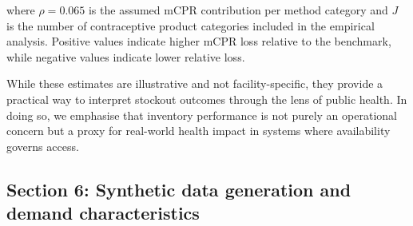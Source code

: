 \documentclass[
  authoryear,
  doubleblind,
  3p]{elsarticle}
\begin{document}
where \(\rho = 0.065\) is the assumed mCPR contribution per method
category and \(J\) is the number of contraceptive product categories
included in the empirical analysis. Positive values indicate higher mCPR
loss relative to the benchmark, while negative values indicate lower
relative loss.

While these estimates are illustrative and not facility-specific, they
provide a practical way to interpret stockout outcomes through the lens
of public health. In doing so, we emphasise that inventory performance
is not purely an operational concern but a proxy for real-world health
impact in systems where availability governs access.

\pagebreak

\subsection{Section 6: Synthetic data generation and demand
characteristics}\label{sec-appendix_wp2_5}
\end{document}
